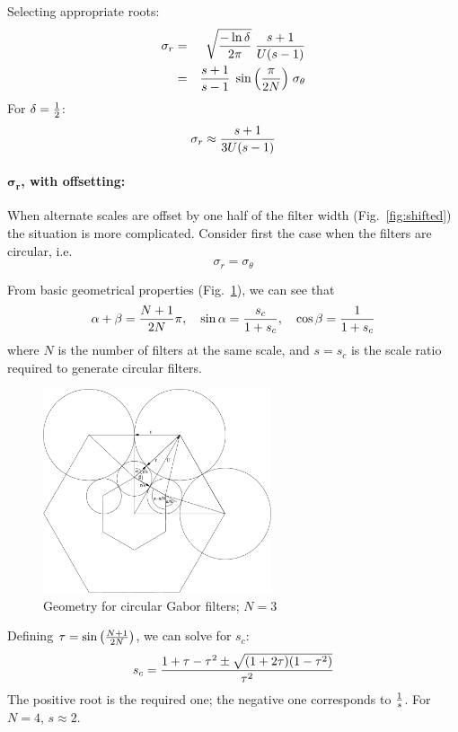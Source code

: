 \documentclass[12pt,a4]{article}
\begin{document}
Selecting appropriate roots:
\begin{eqnarray}
   \sigma_r &=& \sqrt{-\ln{\delta}\over 2\pi} \;{s+1\over U(s-1)} \label{eq:sigma_r}\\
   &=& {s+1\over s-1}\; \sin{\left(\pi\over2N\right)}\; \sigma_\theta \nonumber
\end{eqnarray}
For $\delta={1\over2}$:
\[ \sigma_r \approx {s+1\over 3U(s-1)} \]
 
\paragraph{$\mathbf{\sigma_r}$, with offsetting:}
When alternate scales are offset by one half of the filter width (Fig.~\ref{fig:shifted}) the situation is more complicated.  Consider first the case when the filters are circular, i.e.\ 
\begin{equation}
  \label{eq:circ}
  \sigma_r = \sigma_\theta
\end{equation}

From basic geometrical properties (Fig.~\ref{fig:circles}), we can see that 
\[ \alpha + \beta = {N+1\over 2N}\pi, \quad \sin\alpha = {s_c\over 1+s_c}, \quad \cos\beta = {1\over 1+s_c} \]
where $N$ is the number of filters at the same scale, and $s=s_c$ is the scale ratio required to generate circular filters.
\begin{figure}
  \centering
  \includegraphics[width=0.6\textwidth]{circles}
  \caption{Geometry for circular Gabor filters; $N = 3$}
  \label{fig:circles}
\end{figure}

Defining $\tau = \sin\left({N+1\over 2N}\right)$, we can solve for $s_c$:
\[ s_c = {1+\tau-\tau^2 \pm \sqrt{(1+2\tau)(1-\tau^2)}\over \tau^2} \]
The positive root is the required one; the negative one corresponds to $1\over s$. For $N=4$, $s \approx 2$.
\end{document}
